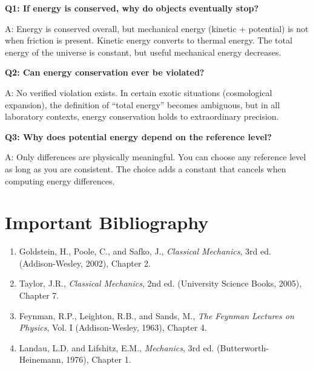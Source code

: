 \textbf{Q1: If energy is conserved, why do objects eventually stop?}

A: Energy is conserved overall, but mechanical energy (kinetic + potential) is not when friction is present. Kinetic energy converts to thermal energy. The total energy of the universe is constant, but useful mechanical energy decreases.

\textbf{Q2: Can energy conservation ever be violated?}

A: No verified violation exists. In certain exotic situations (cosmological expansion), the definition of ``total energy'' becomes ambiguous, but in all laboratory contexts, energy conservation holds to extraordinary precision.

\textbf{Q3: Why does potential energy depend on the reference level?}

A: Only differences are physically meaningful. You can choose any reference level as long as you are consistent. The choice adds a constant that cancels when computing energy differences.
\section*{Important Bibliography}

\begin{enumerate}
\item Goldstein, H., Poole, C., and Safko, J., \textit{Classical Mechanics}, 3rd ed. (Addison-Wesley, 2002), Chapter 2.
\item Taylor, J.R., \textit{Classical Mechanics}, 2nd ed. (University Science Books, 2005), Chapter 7.
\item Feynman, R.P., Leighton, R.B., and Sands, M., \textit{The Feynman Lectures on Physics}, Vol. I (Addison-Wesley, 1963), Chapter 4.
\item Landau, L.D. and Lifshitz, E.M., \textit{Mechanics}, 3rd ed. (Butterworth-Heinemann, 1976), Chapter 1.
\end{enumerate}

